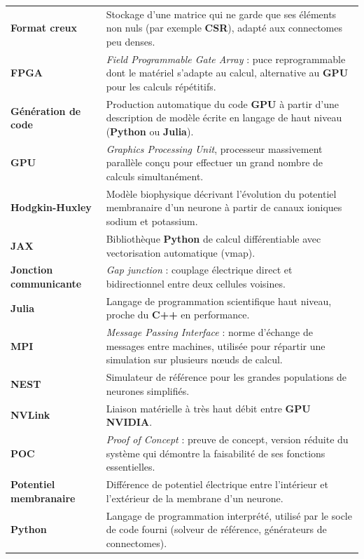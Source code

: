 \documentclass{report}
\begin{document}
\begin{longtable}{@{}p{3.9cm}p{11cm}@{}}
    \textbf{Format creux} & Stockage d'une matrice qui ne garde que ses éléments non nuls (par exemple \textbf{CSR}), adapté aux connectomes peu denses. \\[6pt]
    \textbf{FPGA} & \emph{Field Programmable Gate Array} : puce reprogrammable dont le matériel s'adapte au calcul, alternative au \textbf{GPU} pour les calculs répétitifs. \\[6pt]
    \textbf{Génération de code} & Production automatique du code \textbf{GPU} à partir d'une description de modèle écrite en langage de haut niveau (\textbf{Python} ou \textbf{Julia}). \\[6pt]
    \textbf{GPU} & \textit{Graphics Processing Unit}, processeur massivement parallèle conçu pour effectuer un grand nombre de calculs simultanément. \\[6pt]
    \textbf{Hodgkin-Huxley} & Modèle biophysique décrivant l'évolution du potentiel membranaire d'un neurone à partir de canaux ioniques sodium et potassium. \\[6pt]
    \textbf{JAX} & Bibliothèque \textbf{Python} de calcul différentiable avec vectorisation automatique (vmap). \\[6pt]
    \textbf{Jonction communicante} & \emph{Gap junction} : couplage électrique direct et bidirectionnel entre deux cellules voisines. \\[6pt]
    \textbf{Julia} & Langage de programmation scientifique haut niveau, proche du \textbf{C++} en performance. \\[6pt]
    \textbf{MPI} & \emph{Message Passing Interface} : norme d'échange de messages entre machines, utilisée pour répartir une simulation sur plusieurs nœuds de calcul. \\[6pt]
    \textbf{NEST} & Simulateur de référence pour les grandes populations de neurones simplifiés. \\[6pt]
    \textbf{NVLink} & Liaison matérielle à très haut débit entre \textbf{GPU} \textbf{NVIDIA}. \\[6pt]
    \textbf{POC} & \emph{Proof of Concept} : preuve de concept, version réduite du système qui démontre la faisabilité de ses fonctions essentielles. \\[6pt]
    \textbf{Potentiel membranaire} & Différence de potentiel électrique entre l'intérieur et l'extérieur de la membrane d'un neurone. \\[6pt]
    \textbf{Python} & Langage de programmation interprété, utilisé par le socle de code fourni (solveur de référence, générateurs de connectomes). \\[6pt]

\end{longtable}
\end{document}

